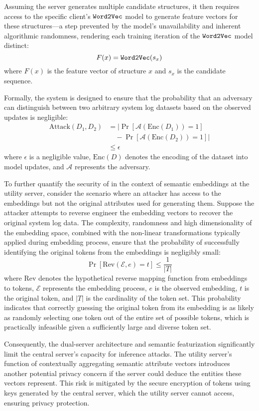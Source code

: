 Assuming the server generates multiple candidate structures, it then requires access to the specific client's \(\texttt{Word2Vec}\) model to generate feature vectors for these structures---a step prevented by the model's unavailability and inherent algorithmic randomness, rendering each training iteration of the \(\texttt{Word2Vec}\) model distinct:
\[ F(x) = \texttt{Word2Vec}(s_x) \]
where \(F(x)\) is the feature vector of structure \(x\) and \(s_x\) is the candidate sequence.

Formally, the system \Sys is designed to ensure that the probability that an adversary can distinguish between two arbitrary system log datasets based on the observed updates is negligible:
\begin{align*}
\text{Attack}(D_1, D_2) &= \left| \Pr[\mathcal{A}(\text{Enc}(D_1)) = 1] \right. \nonumber \\
&\quad - \left. \Pr[\mathcal{A}(\text{Enc}(D_2)) = 1] \right| \\
&\leq \epsilon \nonumber
\end{align*}
where \(\epsilon\) is a negligible value, \(\text{Enc}(D)\) denotes the encoding of the dataset into model updates, and \(\mathcal{A}\) represents the adversary.

To further quantify the security of \Sys in the context of semantic embeddings at the utility server, consider the scenario where an attacker has access to the \wordvec embeddings but not the original attributes used for generating them. Suppose the attacker attempts to reverse engineer the embedding vectors to recover the original system log data. The complexity, randomness and high dimensionality of the embedding space, combined with the non-linear transformations typically applied during \wordvec embedding process, ensure that the probability of successfully identifying the original tokens from the embeddings is negligibly small:
\[
\Pr[\text{Rev}(\mathcal{E}, e) = t] \leq \frac{1}{|T|}
\]
where \(\text{Rev}\) denotes the hypothetical reverse mapping function from embeddings to tokens, \(\mathcal{E}\) represents the embedding process, \(e\) is the observed embedding, \(t\) is the original token, and \(|T|\) is the cardinality of the token set. This probability indicates that correctly guessing the original token from its embedding is as likely as randomly selecting one token out of the entire set of possible tokens, which is practically infeasible given a sufficiently large and diverse token set.

Consequently, the dual-server architecture and semantic featurization significantly limit the central server's capacity for inference attacks. The utility server's function of contextually aggregating semantic attribute vectors introduces another potential privacy concern if the server could deduce the entities these vectors represent. This risk is mitigated by the secure encryption of tokens using keys generated by the central server, which the utility server cannot access, ensuring privacy protection.

